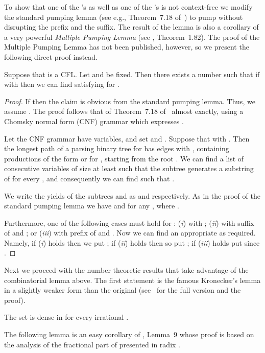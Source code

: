 \documentclass[12pt]{article}
\begin{document}
To show that one of the 's as well as one of the 's is not
context-free we modify the standard pumping lemma (see e.g., Theorem~7.18 of~\cite{hum})
to pump without disrupting the prefix and the suffix. The result of
the lemma is also a corollary of a very powerful {\it Multiple Pumping
  Lemma\/} (see \cite{Kracht}, Theorem~1.82). The proof of the
Multiple Pumping Lemma has not been published, however, so we present
the following direct proof instead.

\begin{lemma}\label{cycle}
Suppose that  is a CFL.
Let  and  be fixed.
Then there exists a number  such that
if  with  then
we can find  satisfying
 for .
\end{lemma}
\begin{proof}
If 
then the claim is obvious from the standard pumping lemma.
Thus, we assume .
The proof follows that of Theorem~7.18
of~\cite{hum} almost exactly, 
using a Chomsky normal form (CNF) grammar which expresses .

Let the CNF grammar have  variables,
and set  and .
Suppose that  with .
Then the longest path of a parsing binary tree for 
has  edges with ,
containing  productions
of the form 
or  for ,
starting from the root .
We can find 
a list of consecutive variables
 of size at least 
such that the subtree  generates a substring of 
for every ,
and consequently we can find 
such that .


We write the yields of the subtrees 
and  as  and  respectively.
As in the proof of the standard pumping lemma we have
 and  for any ,
where .

Furthermore, one of the following cases must hold for :
({\it i\/})  with ;
({\it ii\/})  with suffix  of  and ;
or
({\it iii\/})  with prefix  of  and .
Now we can find an appropriate 
as required. Namely,
if ({\it i\/}) holds then we put ;
if ({\it ii\/}) holds then  so put ;
if ({\it iii\/}) holds put  since .
\end{proof}

Next we proceed with the number theoretic results that take advantage
of the combinatorial lemma above. The first statement is the
famous Kronecker's lemma in a slightly weaker form than the original
(see~\cite{Hardy} for the full version and the proof).

\begin{lemma} The set
   is dense in  for
  every irrational .
\end{lemma}

The following lemma is an easy corollary of \cite{Clinger},
Lemma~9 whose proof is based on the analysis of the fractional part of
 presented in radix .
\end{document}
